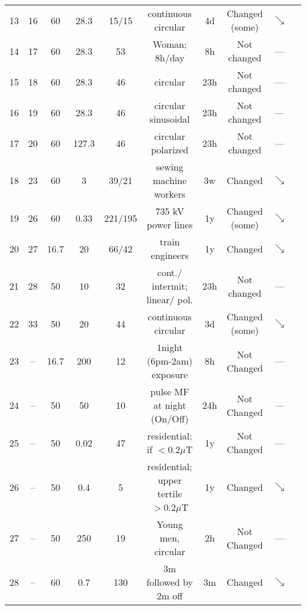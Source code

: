 \begin{tabular}{cccccccccc}
13& 16 & 60 & 28.3 & 15/15 & continuous circular & 4d & Changed (some) & $\searrow$& \citet{Graham2000} \\
14& 17 & 60 & 28.3 & 53 & Woman; 8h/day & 8h & Not changed & --- &\citet{Graham2001a} \\
15& 18 & 60 & 28.3 & 46 & circular & 23h & Not changed & --- &\citet{Graham2001b} \\
16& 19 & 60 & 28.3 & 46 &circular sinusoidal & 23h & Not changed & --- &\citet{Graham2001b} \\ 
17& 20 & 60 & 127.3 & 46 &circular polarized & 23h & Not changed & --- &\citet{Graham2001b} \\
18& 23 & 60 & 3 & 39/21 & sewing machine workers  & 3w & Changed & $\searrow$&  \citet{Juutilainen2000} \\
19 & 26 & 60 & 0.33 & 221/195 & 735 kV power lines & 1y & Changed  (some) & $\searrow$& \citet{Levallois2001} \\
20 & 27 & 16.7 &20 & 66/42 & train engineers  & 1y & Changed & $\searrow$& \citet{Pfluger1996} \\
21 & 28 & 50 & 10 & 32 & cont./ intermit; linear/ pol. & 23h & Not changed & --- & \citet{Selmaoui1996} \\
22 & 33 & 50 & 20 & 44 & continuous circular  & 3d & Changed (some) & $\searrow$& \citet{Wood1998}\\ %
\hline
23& -- & 16.7 & 200 & 12 & 1night (6pm-2am) exposure         & 8h & Not Changed & ---& \citet{Griefahn2001} \\
24& -- &50& 50 & 10 & pulse MF at night  (On/Off)             &24h & Not Changed & ---& \citet{Kurokawa2003}\\
25& -- &50& 0.02 & 47 & residential;    if $<0.2\mu$T                     &  1y & Not Changed & ---& \citet{Cocco2005}\\
26& -- &50& 0.4 & 5 & residential;   upper tertile $>0.2\mu$T  &  1y & Changed   & $\searrow$& \citet{Cocco2005}\\
27 & -- & 50 & 250  & 19 & Young men,  circular               & 2h &Not  Changed & --- & \citet{Warman2003}\\
28 & -- & 60 & 0.7 & 130 & 3m followed by 2m off      & 3m & Changed & $\searrow$& \citet{Davis2006}\\
\hline
\end{tabular}
